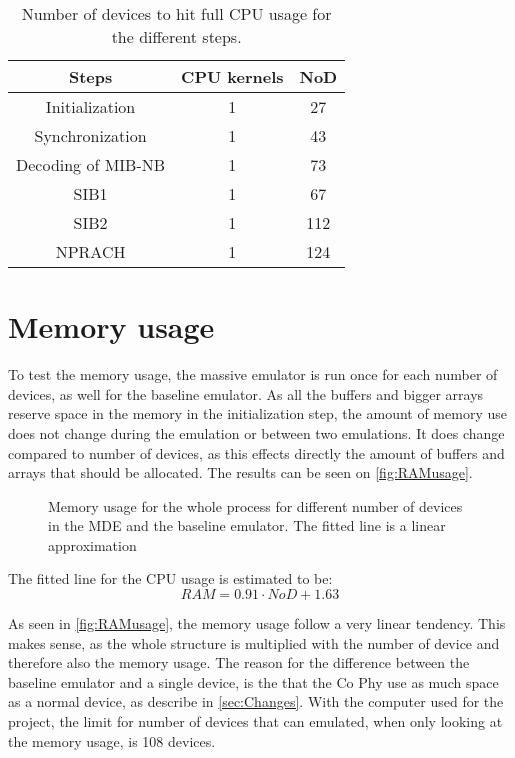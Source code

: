 \begin{table}[H]
\centering
\begin{tabular}{|c|c|c|}
\hline
Steps & CPU kernels & NoD \\
\hline
Initialization & 1 & 27 \\
\hline
Synchronization & 1 & 43 \\
\hline
Decoding of MIB-NB & 1 & 73 \\
\hline
SIB1 & 1 & 67 \\
\hline
SIB2 & 1 & 112 \\
\hline
NPRACH & 1 & 124 \\
\hline
\end{tabular}
\caption{Number of devices to hit full CPU usage for the different steps.}
\label{tab:NoDCPU}
\end{table}

\section{Memory usage}
To test the memory usage, the massive emulator is run once for each number of devices, as well for the baseline emulator. As all the buffers and bigger arrays reserve space in the memory in the initialization step, the amount of memory use does not change during the emulation or between two emulations. It does change compared to number of devices, as this effects directly the amount of buffers and arrays that should be allocated. The results can be seen on \autoref{fig:RAMusage}.

\begin{figure}[H]
\centering
\resizebox{0.5\textwidth}{!}{
}
\caption{Memory usage for the whole process for different number of devices in the MDE and the baseline emulator. The fitted line is a linear approximation}
\label{fig:RAMusage}
\end{figure}

The fitted line for the CPU usage is estimated to be:
\begin{equation}
RAM = 0.91 \cdot NoD + 1.63
\end{equation}


As seen in \autoref{fig:RAMusage}, the memory usage follow a very linear tendency. This makes sense, as the whole structure is multiplied with the number of device and therefore also the memory usage. The reason for the difference between the baseline emulator and a single device, is the that the Co Phy use as much space as a normal device, as describe in \autoref{sec:Changes}. With the computer used for the project, the limit for number of devices that can emulated, when only looking at the memory usage, is 108 devices.




